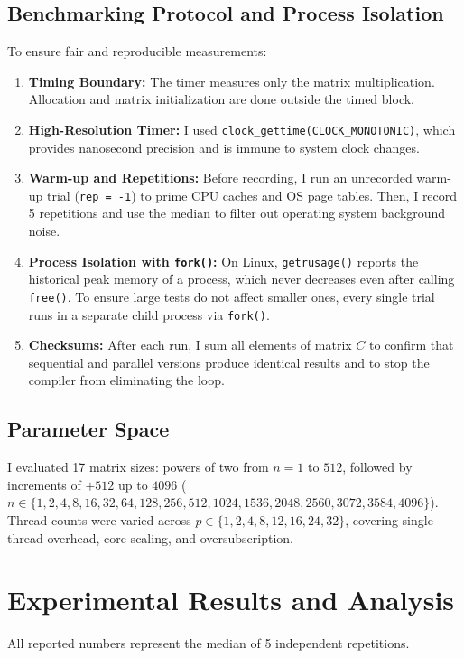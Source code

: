 \documentclass[11pt,a4paper]{article}
\begin{document}
\subsection{Benchmarking Protocol and Process Isolation}
To ensure fair and reproducible measurements:
\begin{enumerate}
    \item \textbf{Timing Boundary:} The timer measures only the matrix multiplication. Allocation and matrix initialization are done outside the timed block.
    \item \textbf{High-Resolution Timer:} I used \texttt{clock\_gettime(CLOCK\_MONOTONIC)}, which provides nanosecond precision and is immune to system clock changes.
    \item \textbf{Warm-up and Repetitions:} Before recording, I run an unrecorded warm-up trial (\texttt{rep = -1}) to prime CPU caches and OS page tables. Then, I record 5 repetitions and use the median to filter out operating system background noise.
    \item \textbf{Process Isolation with \texttt{fork()}:} On Linux, \texttt{getrusage()} reports the historical peak memory of a process, which never decreases even after calling \texttt{free()}. To ensure large tests do not affect smaller ones, every single trial runs in a separate child process via \texttt{fork()}.
    \item \textbf{Checksums:} After each run, I sum all elements of matrix $C$ to confirm that sequential and parallel versions produce identical results and to stop the compiler from eliminating the loop.
\end{enumerate}

\subsection{Parameter Space}
I evaluated 17 matrix sizes: powers of two from $n = 1$ to $512$, followed by increments of $+512$ up to $4096$ ($n \in \{1, 2, 4, 8, 16, 32, 64, 128, 256, 512, 1024, 1536, 2048, 2560, 3072, 3584, 4096\}$). 
Thread counts were varied across $p \in \{1, 2, 4, 8, 12, 16, 24, 32\}$, covering single-thread overhead, core scaling, and oversubscription.

\section{Experimental Results and Analysis}

All reported numbers represent the median of 5 independent repetitions.
\end{document}
